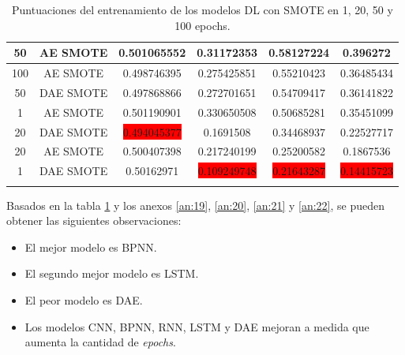 \begin{longtable}{|c|c|c|c|c|c|}
	50 & AE SMOTE & 0.501065552 & 0.31172353 & 0.58127224 & 0.396272\\ \hline
	100 & AE SMOTE & 0.498746395 & 0.275425851 & 0.55210423 & 0.36485434\\ \hline
	50 & DAE SMOTE & 0.497868866 & 0.272701651 & 0.54709417 & 0.36141822\\ \hline
	1 & AE SMOTE & 0.501190901 & 0.330650508 & 0.50685281 & 0.35451099\\ \hline
	20 & DAE SMOTE & \colorbox{red}{0.494045377} & 0.1691508 & 0.34468937 & 0.22527717\\ \hline
	20 & AE SMOTE & 0.500407398 & 0.217240199 & 0.25200582 & 0.1867536\\ \hline
	1 & DAE SMOTE & 0.50162971 & \colorbox{red}{0.109249748} & \colorbox{red}{0.21643287} & \colorbox{red}{0.14415723}\\ \hline
	\caption{Puntuaciones del entrenamiento de los modelos DL con SMOTE en 1, 20, 50 y 100 epochs.}
	\label{t:15}
\end{longtable}

Basados en la tabla \ref{t:15} y los anexos \ref{an:19}, \ref{an:20}, \ref{an:21} y \ref{an:22}, se pueden obtener las siguientes observaciones:
\begin{itemize}
	\item El mejor modelo es BPNN.
	\item El segundo mejor modelo es LSTM.
	\item El peor modelo es DAE.
	\item Los modelos CNN, BPNN, RNN, LSTM y DAE mejoran a medida que aumenta la cantidad de \textit{epochs}.
\end{itemize}

